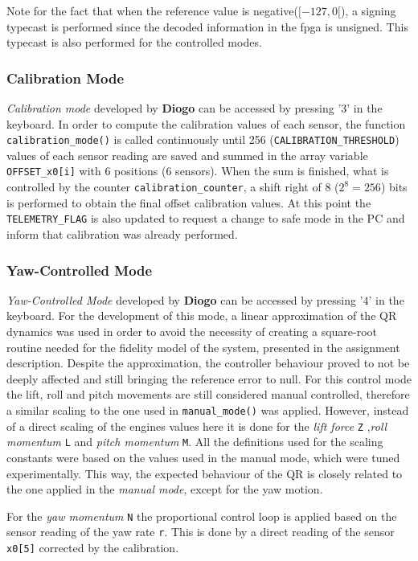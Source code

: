 \documentclass{article}
\begin{document}
Note for the fact that when the reference value is negative($[-127,0[$), a signing typecast is performed since the decoded information in the fpga is unsigned. This typecast is also performed for the controlled modes.

\subsubsection{Calibration Mode}
\textit{Calibration mode} developed by \textbf{Diogo} can be accessed by pressing '$3$' in the keyboard. In order to compute the calibration values of each sensor, the function \texttt{calibration\_mode()} is called continuously until 256 (\texttt{CALIBRATION\_THRESHOLD}) values of each sensor reading are saved and summed in the array variable \texttt{OFFSET\_x0[i]} with 6 positions (6 sensors). When the sum is finished, what is controlled by the counter \texttt{calibration\_counter}, a shift right of $8$ ($2^8=256$) bits is performed to obtain the final offset calibration values. At this point the \texttt{TELEMETRY\_FLAG} is also updated to request a change to safe mode in the PC and inform that calibration was already performed.
\subsubsection{Yaw-Controlled Mode}
\textit{Yaw-Controlled Mode} developed by \textbf{Diogo} can be accessed by pressing '$4$' in the keyboard. For the development of this mode, a linear approximation of the QR dynamics was used in order to avoid the necessity of creating a square-root routine needed for the fidelity model of the system, presented in the assignment description. Despite the approximation, the controller behaviour proved to not be deeply affected and still bringing the reference error to null.
For this control mode the lift, roll and pitch movements are still considered manual controlled, therefore a similar scaling to the one used in \texttt{manual\_mode()} was applied. However, instead of a direct scaling of the engines values here it is done for the \textit{lift force} \texttt{Z} ,\textit{roll momentum} \texttt{L} and \textit{pitch momentum} \texttt{M}. All the definitions used for the scaling constants were based on the values used in the manual mode, which were tuned experimentally. This way, the expected behaviour of the QR is closely related to the one applied in the \textit{manual mode}, except for the yaw motion.

For the \textit{yaw momentum} \texttt{N} the proportional control loop is applied based on the sensor reading of the yaw rate \texttt{r}. This is done by a direct reading of the sensor \texttt{x0[5]} corrected by the calibration. 
\end{document}
